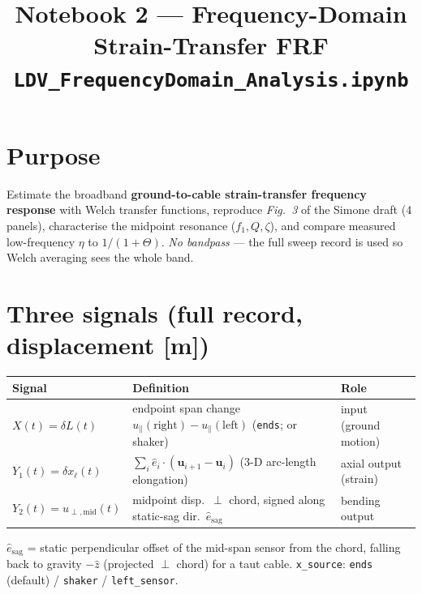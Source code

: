 \documentclass[11pt,a4paper]{article}
\title{\vspace{-1.5em}\textbf{Notebook 2 --- Frequency-Domain Strain-Transfer FRF}\\[2pt]
\large \texttt{LDV\_FrequencyDomain\_Analysis.ipynb}}
\author{}\date{}
\begin{document}
\maketitle\vspace{-3em}

\section*{Purpose}
Estimate the broadband \textbf{ground-to-cable strain-transfer frequency response} with Welch
transfer functions, reproduce \emph{Fig.~3} of the Simone draft (4 panels), characterise the
midpoint resonance ($f_1,Q,\zeta$), and compare measured low-frequency $\eta$ to $1/(1+\Theta)$.
\emph{No bandpass} --- the full sweep record is used so Welch averaging sees the whole band.

\section*{Three signals (full record, displacement [m])}
\begin{table}[h]\centering\footnotesize
\begin{tabular}{@{}lll@{}}
\toprule
\textbf{Signal} & \textbf{Definition} & \textbf{Role}\\\midrule
$X(t)=\delta L(t)$ & endpoint span change $u_\parallel(\text{right})-u_\parallel(\text{left})$ (\texttt{ends}; or shaker) & input (ground motion)\\
$Y_1(t)=\delta x_\ell(t)$ & $\sum_i\hat e_i\!\cdot(\mathbf u_{i+1}-\mathbf u_i)$ (3-D arc-length elongation) & axial output (strain)\\
$Y_2(t)=u_{\perp,\mathrm{mid}}(t)$ & midpoint disp.\ $\perp$ chord, signed along static-sag dir.\ $\hat e_{\mathrm{sag}}$ & bending output\\
\bottomrule
\end{tabular}
\end{table}
$\hat e_{\mathrm{sag}}$ = static perpendicular offset of the mid-span sensor from the chord, falling
back to gravity $-\hat z$ (projected $\perp$ chord) for a taut cable. \texttt{x\_source}: \texttt{ends} (default) / \texttt{shaker} / \texttt{left\_sensor}.

\end{document}

